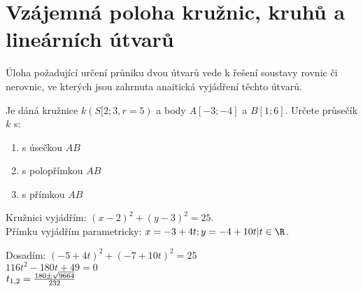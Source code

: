 
\BeginDoc{}
\section{Vzájemná poloha kružnic, kruhů a lineárních útvarů}
\Poz Úloha požadující určení průniku dvou útvarů vede k řešení soustavy rovnic či nerovnic, ve kterých  jsou zahrnuta anaitická vyjádření těchto útvarů.

\Pr

Je dáná kružnice $k(S[2;3,r=5)$ a body $A[-3;-4]$ a $B[1;6]$.
Určete průsečík $k$ s:
\begin{enumerate}
	\item s úsečkou $AB$
	\item s polopřímkou $AB$
	\item s přímkou $AB$
\end{enumerate}

Kružnici vyjádřím: $(x-2)^2 + (y-3)^2 = 25$.\\
Přímku vyjádřím parametricky: $x=-3+4t; y=-4+10t | t\in\R$.

Dosadím: $(-5+4t)^2 + (-7+10t)^2 = 25$\\
$116t^2-180t+49=0$\\
$t_{1,2}=\frac{180\pm\sqrt{9664}}{232} $

